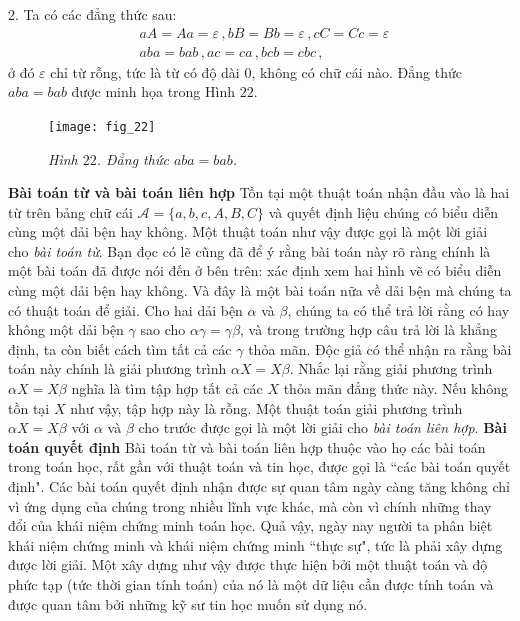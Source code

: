 \begin{multicols}{2}
	\vskip 0.1cm
	$2$. Ta có các đẳng thức sau:
	\begin{align*}
		&aA = Aa = \varepsilon\,, bB = Bb = \varepsilon\,, cC = Cc = \varepsilon\,\\
		&aba = bab\,, ac = ca\,, bcb = cbc\,,
	\end{align*}
	ở đó $\varepsilon$ chỉ từ rỗng, tức là từ có độ dài $0$, không có chữ cái nào. Đẳng thức $aba = bab$ được minh họa trong Hình $22$.
	\begin{figure}[H]
		\vspace*{-5pt}
		\centering
		\captionsetup{labelformat= empty, justification=centering}
		\texttt{[image: fig\_22]}
		\caption{\small\textit{\color{duongvaotoanhoc}Hình $22$. Đẳng thức $aba = bab$.}}
		\vspace*{-10pt}
	\end{figure}
	\textbf{\color{duongvaotoanhoc}Bài toán từ và bài toán liên hợp}
	\vskip 0.1cm
	Tồn tại một thuật toán nhận đầu vào là hai từ trên bảng chữ cái $\mathcal A = \{a, b, c, A, B, C\}$ và quyết định liệu chúng có biểu diễn cùng một dải bện hay không. Một thuật toán như vậy được gọi là một lời giải cho \textit{bài toán từ}. Bạn đọc có lẽ cũng đã để ý rằng bài toán này rõ ràng chính là một bài toán đã được nói đến ở bên trên: xác định xem hai hình vẽ có biểu diễn cùng một dải bện hay không.
	\vskip 0.1cm
	Và đây là một bài toán nữa về dải bện mà chúng ta có thuật toán để giải. Cho hai dải bện $\alpha$ và $\beta$, chúng ta có thể trả lời rằng có hay không một dải bện $\gamma$ sao cho $\alpha \gamma = \gamma \beta$, và trong trường hợp câu trả lời là khẳng định, ta còn biết cách tìm tất cả các $\gamma$ thỏa mãn. Độc giả có thể nhận ra rằng bài toán này chính là giải phương trình $\alpha X = X \beta$. Nhắc lại rằng giải phương trình $\alpha X = X \beta$ nghĩa là tìm tập hợp tất cả các $X$ thỏa mãn đẳng thức này. Nếu không tồn tại $X$ như vậy, tập hợp này là rỗng. Một thuật toán giải phương trình $\alpha X = X \beta$ với $\alpha$ và $\beta$ cho trước được gọi là một lời giải cho \textit{bài toán liên hợp}.
	\vskip 0.1cm
	\textbf{\color{duongvaotoanhoc}Bài toán quyết định}
	\vskip 0.1cm
	Bài toán từ và bài toán liên hợp thuộc vào họ các bài toán trong toán học, rất gần với thuật toán và tin học, được gọi là ``các bài toán quyết định". Các bài toán quyết định nhận được sự quan tâm ngày càng tăng không chỉ vì ứng dụng của chúng trong nhiều lĩnh vực khác, mà còn vì chính những thay đổi của khái niệm chứng minh toán học. Quả vậy, ngày nay người ta phân biệt khái niệm chứng minh và khái niệm chứng minh ``thực sự", tức là phải xây dựng được lời giải. Một xây dựng như vậy được thực hiện bởi một thuật toán và độ phức tạp (tức thời gian tính toán) của nó là một dữ liệu cần được tính toán và được quan tâm bởi những kỹ sư tin học muốn sử dụng nó.

\end{multicols}
